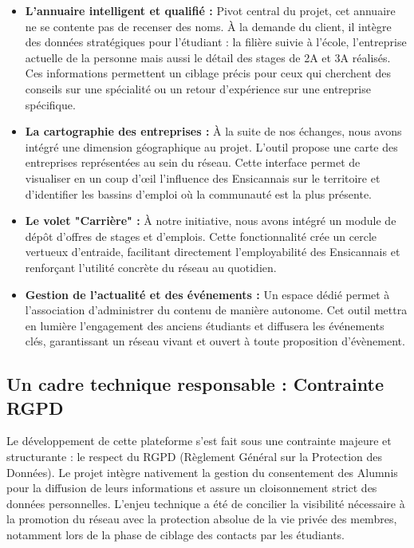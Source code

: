 \documentclass[a4paper,12pt]{article}
\begin{document}
\begin{itemize}[label=\textbullet, itemsep=5pt]
    \item \textbf{L'annuaire intelligent et qualifié :} Pivot central du projet, cet annuaire ne se contente pas de recenser des noms. À la demande du client, il intègre des données stratégiques pour l'étudiant : la filière suivie à l'école, l’entreprise actuelle de la personne mais aussi le détail des stages de 2A et 3A réalisés. Ces informations permettent un ciblage précis pour ceux qui cherchent des conseils sur une spécialité ou un retour d'expérience sur une entreprise spécifique.
    \item \textbf{La cartographie des entreprises :} À la suite de nos échanges, nous avons intégré une dimension géographique au projet. L'outil propose une carte des entreprises représentées au sein du réseau. Cette interface permet de visualiser en un coup d'œil l'influence des Ensicannais sur le territoire et d'identifier les bassins d'emploi où la communauté est la plus présente.
    \item \textbf{Le volet "Carrière" :} À notre initiative, nous avons intégré un module de dépôt d'offres de stages et d'emplois. Cette fonctionnalité crée un cercle vertueux d'entraide, facilitant directement l'employabilité des Ensicannais et renforçant l'utilité concrète du réseau au quotidien.
    \item \textbf{Gestion de l'actualité et des événements :} Un espace dédié permet à l'association d'administrer du contenu de manière autonome. Cet outil mettra en lumière l'engagement des anciens étudiants et diffusera les événements clés, garantissant un réseau vivant et ouvert à toute proposition d’évènement.
\end{itemize}

\subsection{Un cadre technique responsable : Contrainte RGPD}
Le développement de cette plateforme s'est fait sous une contrainte majeure et structurante : le respect du RGPD (Règlement Général sur la Protection des Données). Le projet intègre nativement la gestion du consentement des Alumnis pour la diffusion de leurs informations et assure un cloisonnement strict des données personnelles. L'enjeu technique a été de concilier la visibilité nécessaire à la promotion du réseau avec la protection absolue de la vie privée des membres, notamment lors de la phase de ciblage des contacts par les étudiants.
\end{document}
